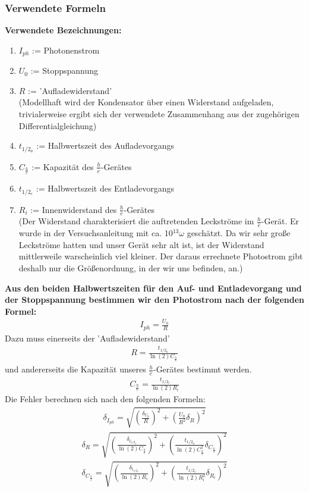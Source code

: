 \documentclass[12px]{scrartcl}
\begin{document}
\subsubsection{Verwendete Formeln}
\textbf{Verwendete Bezeichnungen:}
\begin{enumerate}
\item $I_{ph}$ := Photonenstrom
\item $U_0$ := Stoppspannung
\item $R$ := 'Aufladewiderstand'\\
(Modellhaft wird der Kondensator über einen Widerstand aufgeladen, trivialerweise ergibt sich der verwendete Zusammenhang aus der zugehörigen Differentialgleichung)
\item $t_{1/2_a}$ := Halbwertszeit des Aufladevorgangs
\item $C_{\frac{h}{e}}$ := Kapazität des $\frac{h}{e}$-Gerätes
\item $t_{1/2_e}$ := Halbwertszeit des Entladevorgangs
\item $R_i$ := Innenwiderstand des $\frac{h}{e}$-Gerätes\\
(Der Widerstand charakterisiert die auftretenden Leckströme im $\frac{h}{e}$-Gerät. Er wurde in der Versuchsanleitung mit ca. 10$^{13}\omega$ geschätzt. Da wir sehr große Leckströme hatten und unser Gerät sehr alt ist, ist der Widerstand  mittlerweile warscheinlich viel kleiner. Der daraus errechnete Photostrom gibt deshalb nur die Größenordnung, in der wir uns befinden, an.)
\end{enumerate}
\textbf{Aus den beiden Halbwertszeiten für den Auf- und Entladevorgang und der Stoppspannung bestimmen wir den Photostrom nach der folgenden Formel:}
\begin{align}
I_{ph} = \frac{U_0}{R}
\end{align}
Dazu muss einerseits der 'Aufladewiderstand'
\begin{align}
R = \frac{t_{1/2_a}}{\ln(2)C_{\frac{h}{e}}}
\end{align}
und andererseits die Kapazität unseres $\frac{h}{e}$-Gerätes bestimmt werden.
\begin{align}
C_{\frac{h}{e}} = \frac{t_{1/2_e}}{\ln(2)R_i}
\end{align}
Die Fehler berechnen sich nach den folgenden Formeln:
\begin{align}
\delta_{I_{ph}}= \sqrt{
\left(\frac{\delta_{U_0}}{R}\right)^2+
\left(\frac{U_0}{R^2}\delta_R\right)^2}
\end{align}
\begin{align}
\delta_{R}= \sqrt{
\left(\frac{\delta_{t_{1/2_a}}}{\ln(2)C_{\frac{h}{e}}}\right)^2+
\left(\frac{t_{1/2_a}}{\ln(2)C_{\frac{h}{e}}^2}\delta_{C_{\frac{h}{e}}}\right)^2}
\end{align}
\begin{align}
\delta_{C_{\frac{h}{e}}}= \sqrt{
\left(\frac{\delta_{t_{1/2_e}}}{\ln(2)R_i}\right)^2+
\left(\frac{t_{1/2_e}}{\ln(2)R_i^2}\delta_{R_i}\right)^2}
\end{align}
\end{document}
